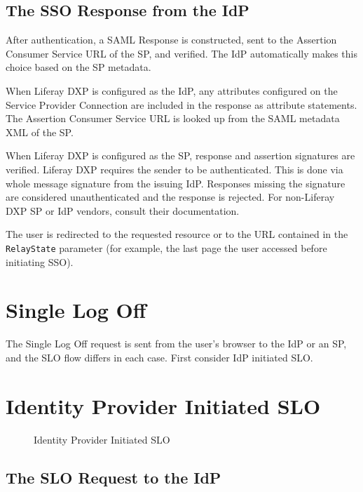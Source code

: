\subsection{The SSO Response from the
IdP}\label{the-sso-response-from-the-idp-1}

After authentication, a SAML Response is constructed, sent to the
Assertion Consumer Service URL of the SP, and verified. The IdP
automatically makes this choice based on the SP metadata.

When Liferay DXP is configured as the IdP, any attributes configured on
the Service Provider Connection are included in the response as
attribute statements. The Assertion Consumer Service URL is looked up
from the SAML metadata XML of the SP.

When Liferay DXP is configured as the SP, response and assertion
signatures are verified. Liferay DXP requires the sender to be
authenticated. This is done via whole message signature from the issuing
IdP. Responses missing the signature are considered unauthenticated and
the response is rejected. For non-Liferay DXP SP or IdP vendors, consult
their documentation.

The user is redirected to the requested resource or to the URL contained
in the \texttt{RelayState} parameter (for example, the last page the
user accessed before initiating SSO).

\section{Single Log Off}\label{single-log-off}

The Single Log Off request is sent from the user's browser to the IdP or
an SP, and the SLO flow differs in each case. First consider IdP
initiated SLO.

\section{Identity Provider Initiated
SLO}\label{identity-provider-initiated-slo}

\begin{figure}
\centering
{}
\caption{Identity Provider Initiated SLO}
\end{figure}

\subsection{The SLO Request to the
IdP}\label{the-slo-request-to-the-idp}

